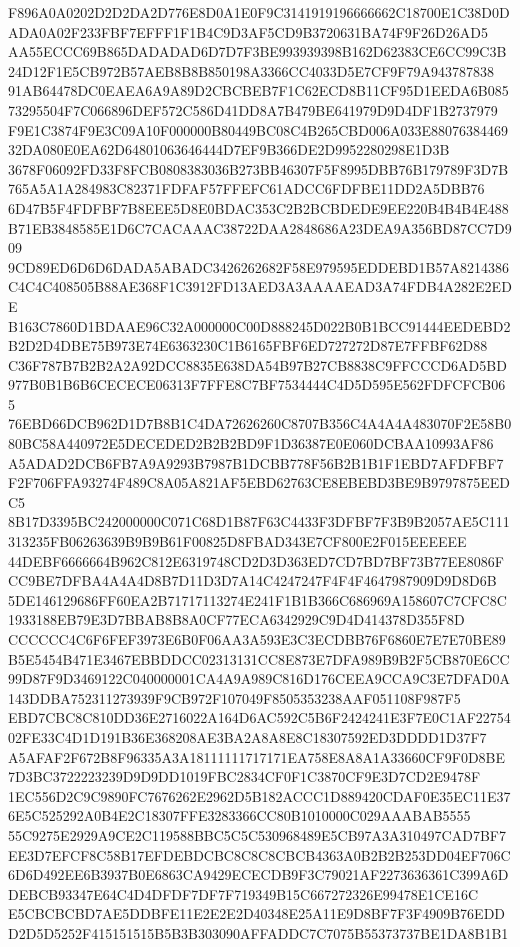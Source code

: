 \documentclass[UTF8,fontset=fandol,zihao=-4,a4paper]{ctexart}
\begin{document}
{{F896A0A0202D2D2DA2D776E8D0A1E0F9C3141919196666662C18700E1C38D0DADA0A02F233FBF7EFFF1F1B4C9D3AF5CD9B3720631BA74F9F26D26AD5
AA55ECCC69B865DADADAD6D7D7F3BE993939398B162D62383CE6CC99C3B24D12F1E5CB972B57AEB8B8B850198A3366CC4033D5E7CF9F79A943787838
91AB64478DC0EAEA6A9A89D2CBCBEB7F1C62ECD8B11CF95D1EEDA6B08573295504F7C066896DEF572C586D41DD8A7B479BE641979D9D4DF1B2737979
F9E1C3874F9E3C09A10F000000B80449BC08C4B265CBD006A033E8807638446932DA080E0EA62D64801063646444D7EF9B366DE2D9952280298E1D3B
3678F06092FD33F8FCB0808383036B273BB46307F5F8995DBB76B179789F3D7B765A5A1A284983C82371FDFAF57FFEFC61ADCC6FDFBE11DD2A5DBB76
6D47B5F4FDFBF7B8EEE5D8E0BDAC353C2B2BCBDEDE9EE220B4B4B4E488B71EB3848585E1D6C7CACAAAC38722DAA2848686A23DEA9A356BD87CC7D909
9CD89ED6D6D6DADA5ABADC3426262682F58E979595EDDEBD1B57A8214386C4C4C408505B88AE368F1C3912FD13AED3A3AAAAEAD3A74FDB4A282E2EDE
B163C7860D1BDAAE96C32A000000C00D888245D022B0B1BCC91444EEDEBD2B2D2D4DBE75B973E74E6363230C1B6165FBF6ED727272D87E7FFBF62D88
C36F787B7B2B2A2A92DCC8835E638DA54B97B27CB8838C9FFCCCD6AD5BD977B0B1B6B6CECECE06313F7FFE8C7BF7534444C4D5D595E562FDFCFCB065
76EBD66DCB962D1D7B8B1C4DA72626260C8707B356C4A4A4A483070F2E58B080BC58A440972E5DECEDED2B2B2BD9F1D36387E0E060DCBAA10993AF86
A5ADAD2DCB6FB7A9A9293B7987B1DCBB778F56B2B1B1F1EBD7AFDFBF7F2F706FFA93274F489C8A05A821AF5EBD62763CE8EBEBD3BE9B9797875EEDC5
8B17D3395BC242000000C071C68D1B87F63C4433F3DFBF7F3B9B2057AE5C111313235FB06263639B9B9B61F00825D8FBAD343E7CF800E2F015EEEEEE
44DEBF6666664B962C812E6319748CD2D3D363ED7CD7BD7BF73B77EE8086FCC9BE7DFBA4A4A4D8B7D11D3D7A14C4247247F4F4F4647987909D9D8D6B
5DE146129686FF60EA2B71717113274E241F1B1B366C686969A158607C7CFC8C1933188EB79E3D7BBAB8B8A0CF77ECA6342929C9D4D414378D355F8D
CCCCCC4C6F6FEF3973E6B0F06AA3A593E3C3ECDBB76F6860E7E7E70BE89B5E5454B471E3467EBBDDCC02313131CC8E873E7DFA989B9B2F5CB870E6CC
99D87F9D3469122C040000001CA4A9A989C816D176CEEA9CCA9C3E7DFAD0A143DDBA752311273939F9CB972F107049F8505353238AAF051108F987F5
EBD7CBC8C810DD36E2716022A164D6AC592C5B6F2424241E3F7E0C1AF2275402FE33C4D1D191B36E368208AE3BA2A8A8E8C18307592ED3DDDD1D37F7
A5AFAF2F672B8F96335A3A18111111717171EA758E8A8A1A33660CF9F0D8BE7D3BC3722223239D9D9DD1019FBC2834CF0F1C3870CF9E3D7CD2E9478F
1EC556D2C9C9890FC7676262E2962D5B182ACCC1D889420CDAF0E35EC11E376E5C525292A0B4E2C18307FFE3283366CC80B1010000C029AAABAB5555
55C9275E2929A9CE2C119588BBC5C5C530968489E5CB97A3A310497CAD7BF7EE3D7EFCF8C58B17EFDEBDCBC8C8C8CBCB4363A0B2B2B253DD04EF706C
6D6D492EE6B3937B0E6863CA9429ECECDB9F3C79021AF2273636361C399A6DDEBCB93347E64C4D4DFDF7DF7F719349B15C667272326E99478E1CE16C
E5CBCBCBD7AE5DDBFE11E2E2E2D40348E25A11E9D8BF7F3F4909B76EDDD2D5D5252F415151515B5B3B303090AFFADDC7C7075B55373737BE1DA8B1B1
}}
\end{document}
